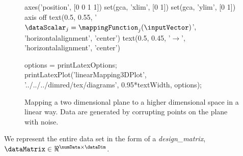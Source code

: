 \begin{figure}
\begin{matlab}
    axes('position', [0 0 1 1])
    set(gca, 'xlim', [0 1])
    set(gca, 'ylim', [0 1])
    axis off
    text(0.5, 0.55, '\large$\dataScalar_j = \mappingFunction_j(\inputVector)$', 'horizontalalignment', 'center')
    text(0.5, 0.45, '\LARGE$\longrightarrow$', 'horizontalalignment', 'center')


    options = printLatexOptions;
    printLatexPlot('linearMapping3DPlot', '../../../dimred/tex/diagrams', 0.95*textWidth, options);

  \end{matlab}
  \begin{center}
  \end{center}
  \caption{Mapping a two dimensional plane to a higher dimensional
    space in a linear way. Data are generated by corrupting points on
    the plane with noise.}\label{fig:mapping2to3linear}
\end{figure}

    
  
  

We represent the entire data set in the form of a
\emph{\gls{design_matrix}}, $\dataMatrix \in
\Re^{\numData\times\dataDim}$.


